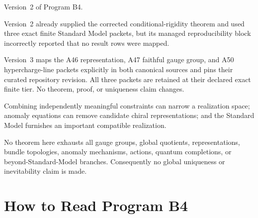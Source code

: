 \documentclass[11pt]{article}
\begin{document}
\begin{description}[leftmargin=2.5cm,style=nextline]
\item[Supersedes.]
Version~2 of Program B4.

\item[Reason.]
Version~2 already supplied the corrected conditional-rigidity theorem and
used three exact finite Standard Model packets, but its managed
reproducibility block incorrectly reported that no result rows were mapped.

\item[Resolution.]
Version~3 maps the A46 representation, A47 faithful gauge group, and A50
hypercharge-line packets explicitly in both canonical sources and pins their
curated repository revision.  All three packets are retained at their
declared exact finite tier.  No theorem, proof, or uniqueness claim changes.

\item[Retained content.]
Combining independently meaningful constraints can narrow a realization
space; anomaly equations can remove candidate chiral representations; and the
Standard Model furnishes an important compatible realization.

\item[Open boundary.]
No theorem here exhausts all gauge groups, global quotients, representations,
bundle topologies, anomaly mechanisms, actions, quantum completions, or
beyond-Standard-Model branches.  Consequently no global uniqueness or
inevitability claim is made.
\end{description}

\begingroup
\small
\setlength{\parskip}{0pt}
\tableofcontents
\endgroup
\newpage

\section{How to Read Program B4}
\end{document}
